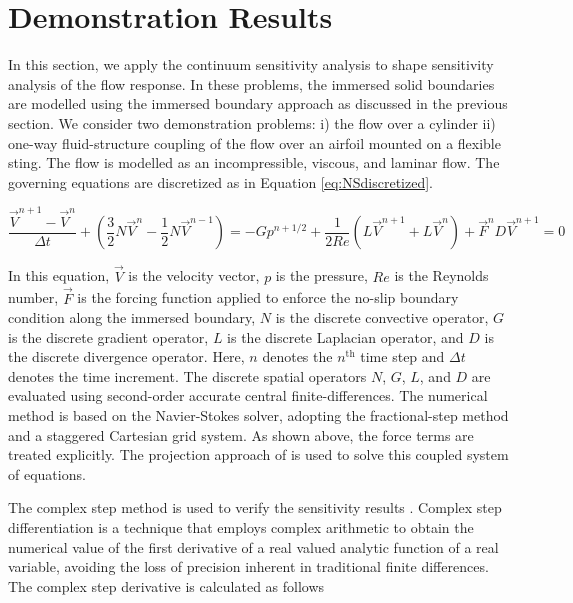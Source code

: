 \documentclass[12pt]{aiaa-pretty}
\begin{document}
\section{Demonstration Results}
In this section, we apply the continuum sensitivity analysis to shape sensitivity analysis of the flow response. In these problems, the immersed solid boundaries are modelled using the immersed boundary approach as discussed in the previous section. We consider two demonstration problems: i) the flow over a cylinder ii) one-way fluid-structure coupling of the flow over an airfoil mounted on a flexible sting. The flow is modelled as an incompressible, viscous, and laminar flow. The governing equations are discretized as in Equation \eqref{eq:NSdiscretized}.

%
\begin{subequations}\label{eq:NSdiscretized}
\begin{equation}
	\frac{\vec{V}^{n+1} - \vec{V}^n}{\Delta t} + 
	\left( \frac{3}{2} N\vec{V}^n - \frac{1}{2} N\vec{V}^{n-1} \right) = 
	-G p^{n + 1/2} + 
	\frac{1}{2Re} \left( L \vec{V}^{n+1} + L \vec{V}^n \right) + 
	\vec{F}^n
\end{equation}
\begin{equation}
	D \vec{V}^{n+1} = 0
\end{equation}
\end{subequations}
%

In this equation, $\vec{V}$ is the velocity vector, $p$ is the pressure, $Re$ is the Reynolds number, $\vec{F}$ is the forcing function applied to enforce the no-slip boundary condition along the immersed boundary, $N$ is the discrete convective operator, $G$ is the discrete gradient operator, $L$ is the discrete Laplacian operator, and $D$ is the discrete divergence operator. Here, $n$ denotes the $n^\text{th}$ time step and $\Delta t$ denotes the time increment. The discrete spatial operators $N$, $G$, $L$, and $D$ are evaluated using second-order accurate central finite-differences. The numerical method is based on the Navier-Stokes solver, adopting the fractional-step method and a staggered Cartesian grid system. As shown above, the force terms are treated explicitly. The projection approach of \cite{brown2001accurate} is used to solve this coupled system of equations.

The complex step method is used to verify the sensitivity results \cite{martins2003complex}. Complex step differentiation is a technique that employs complex arithmetic to obtain the numerical value of the first derivative of a real valued analytic function of a real variable, avoiding the loss of precision inherent in traditional finite differences. The complex step derivative is calculated as follows
\end{document}
